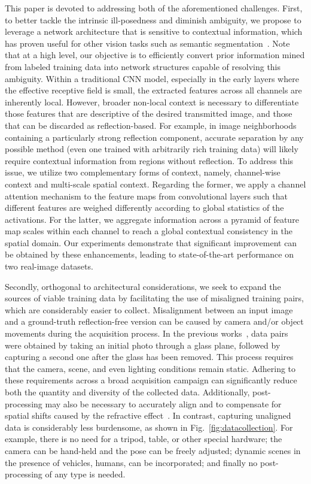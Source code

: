 \documentclass[10pt,twocolumn,letterpaper]{article}
\begin{document}
This paper is devoted to addressing both of the aforementioned challenges.  First, to better tackle the intrinsic ill-posedness and diminish ambiguity, we propose to leverage a network architecture that is sensitive to contextual information, which has proven useful for other vision tasks such as semantic segmentation~\cite{He2015Spatial,zhao2017pyramid,Zhang_2018_CVPR,Hu_2018_CVPR}. Note that at a high level, our objective is to efficiently convert prior information mined from labeled training data into network structures capable of resolving this ambiguity.  Within a traditional CNN model, especially in the early layers where the effective receptive field is small, the extracted features across all channels are inherently local.  However, broader non-local context is necessary to differentiate those features that are descriptive of the desired transmitted image, and those that can be discarded as reflection-based.  For example, in image neighborhoods containing a particularly strong reflection component, accurate separation by any possible method (even one trained with arbitrarily rich training data) will likely require contextual information from regions without reflection.  To address this issue, we utilize two complementary forms of context, namely, channel-wise context and multi-scale spatial context. Regarding the former, we apply a channel attention mechanism to the feature maps from convolutional layers such that different features are weighed differently according to global statistics of the activations. For the latter, we aggregate information across a pyramid of feature map scales within each channel to reach a global contextual consistency in the spatial domain. Our experiments demonstrate that significant improvement can be obtained by these enhancements, leading to state-of-the-art performance on two real-image datasets. 

Secondly, orthogonal to architectural considerations, we seek to expand the sources of viable training data by facilitating the use of misaligned training pairs, which are considerably easier to collect.  Misalignment between an input image  and a ground-truth reflection-free version  can be caused by camera and/or object movements during the acquisition process.  In the previous works~\cite{Wan_2017_ICCV,Zhang_2018_CVPR}, data pairs  were obtained by taking an initial photo through a glass plane, followed by capturing a second one after the glass has been removed.  This process requires that the camera, scene, and even lighting conditions remain static. Adhering to these requirements across a broad acquisition campaign can significantly reduce both the quantity and diversity of the collected data. Additionally, post-processing may also be necessary to accurately align  and  to compensate for spatial shifts caused by the refractive effect~\cite{Wan_2017_ICCV}. In contrast, capturing unaligned data is considerably less burdensome, as shown in Fig.~\ref{fig:datacollection}.  For example, there is no need for a tripod, table, or other special hardware; the camera can be hand-held and the pose can be freely adjusted; dynamic scenes in the presence of vehicles, humans, \etc can be incorporated; and finally no post-processing of any type is needed.
\end{document}
